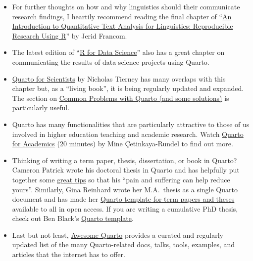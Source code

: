 \documentclass[
  letterpaper,
  DIV=11,
  numbers=noendperiod]{scrreprt}
\begin{document}
\begin{tcolorbox}[enhanced jigsaw, arc=.35mm, bottomrule=.15mm, bottomtitle=1mm, breakable, colback=white, colbacktitle=quarto-callout-note-color!10!white, colframe=quarto-callout-note-color-frame, coltitle=black, left=2mm, leftrule=.75mm, opacityback=0, opacitybacktitle=0.6, rightrule=.15mm, title=\textcolor{quarto-callout-note-color}{\faInfo}\hspace{0.5em}{Going further with Quarto}, titlerule=0mm, toprule=.15mm, toptitle=1mm]

\begin{itemize}
\item
  For further thoughts on how and why linguistics should their
  communicate research findings, I heartily recommend reading the final
  chapter of
  ``\href{https://qtalr.com/book/part_5/11_contribute.html}{An
  Introduction to Quantitative Text Analysis for Linguistics:
  Reproducible Research Using R}'' by Jerid Francom.
\item
  The latest edition of ``\href{https://r4ds.hadley.nz/communicate}{R
  for Data Science}'' also has a great chapter on communicating the
  results of data science projects using Quarto.
\item
  \href{https://qmd4sci.njtierney.com/}{Quarto for Scientists} by
  Nicholas Tierney has many overlaps with this chapter but, as a
  ``living book'', it is being regularly updated and expanded. The
  section on
  \href{https://qmd4sci.njtierney.com/common-problems.html}{Common
  Problems with Quarto (and some solutions)} is particularly useful.
\item
  Quarto has many functionalities that are particularly attractive to
  those of us involved in higher education teaching and academic
  research. Watch
  \href{https://www.youtube.com/embed/EbAAmrB0luA?si=AwJ3szmUKECHfwuS}{Quarto
  for Academics} (20 minutes) by Mine Çetinkaya-Rundel to find out more.
\item
  Thinking of writing a term paper, thesis, dissertation, or book in
  Quarto? Cameron Patrick wrote his doctoral thesis in Quarto and has
  helpfully put together some
  \href{https://cameronpatrick.com/post/2023/07/quarto-thesis-formatting/}{great
  tips} so that his ``pain and suffering can help reduce yours''.
  Similarly, Gina Reinhard wrote her M.A.~thesis as a single Quarto
  document and has made her
  \href{https://github.com/ginareinhard/thesisTemplate}{Quarto template
  for term papers and theses} available to all in open access. If you
  are writing a cumulative PhD thesis, check out Ben Black's
  \href{https://blenback.github.io/quarto-eth-phd-thesis.html}{Quarto
  template}.
\item
  Last but not least,
  \href{https://github.com/mcanouil/awesome-quarto}{Awesome Quarto}
  provides a curated and regularly updated list of the many
  Quarto-related docs, talks, tools, examples, and articles that the
  internet has to offer.
\end{itemize}

\end{tcolorbox}
\end{document}
